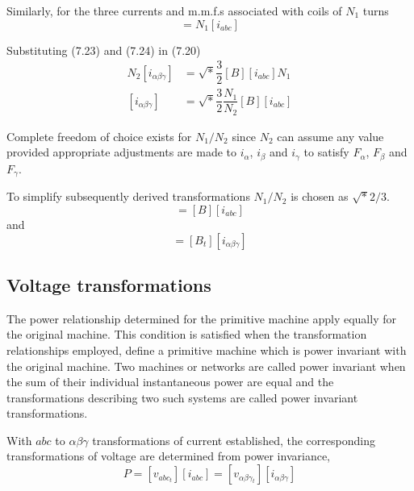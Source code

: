 \documentclass[a4paper,numbers=noenddot,12pt]{scrbook}
\begin{document}
    Similarly, for the three currents and m.m.f.s associated with coils of $N_1$ turns
    \begin{equation}
        [F_{abc}] = N_1 [i_{abc}]
        \label{eq:Eq7.24}
    \end{equation}

    Substituting (7.23) and (7.24)  in (7.20)
    \begin{align}
        N_2[i_{\alpha \beta \gamma}] & = \sqrt*{\dfrac{3}{2}} [B] [i_{abc}] N_1 \nonumber \\
        [i_{\alpha \beta \gamma}] & = \sqrt*{\dfrac{3}{2}} \dfrac{N_1}{N_2} [B] [i_{abc}]
        \label{eq:Eq7.25}
    \end{align}

    Complete freedom of choice exists for $N_1 / N_2$ since $N_2$ can assume any value provided appropriate adjustments are made to $i_{\alpha}$, $i_{\beta}$ and $i_{\gamma}$ to satisfy $F_{\alpha}$, $F_{\beta}$ and $F_{\gamma}$.

    To simplify subsequently derived transformations $N_1 / N_2$ is chosen as $\sqrt*{2/3}$.
    \begin{equation}
        [i_{\alpha \beta \gamma}] = [B][i_{abc}]
        \label{eq:Eq7.26}
    \end{equation}
    and
    \begin{equation}
        [i_{abc}] = [B_t] [i_{\alpha \beta \gamma}]
        \label{eq:Eq7.27}
    \end{equation}

    \subsection{Voltage transformations}
    The power relationship determined  for the primitive machine apply equally for the original machine. This condition is satisfied when the transformation relationships employed, define a primitive machine which is power invariant with the original machine. Two machines or networks are called power invariant when the sum of their individual instantaneous power are equal and the transformations describing two such systems are called power
    invariant transformations.

    With $abc$ to $\alpha \beta \gamma$ transformations of current established, the corresponding transformations of voltage are determined from power invariance,
    \begin{equation}
        P = [v_{abc_{t}}][i_{abc}] = [v_{\alpha \beta \gamma_{t}}][i_{\alpha \beta \gamma}]
        \label{eq:Eq7.28}
    \end{equation}
\end{document}
